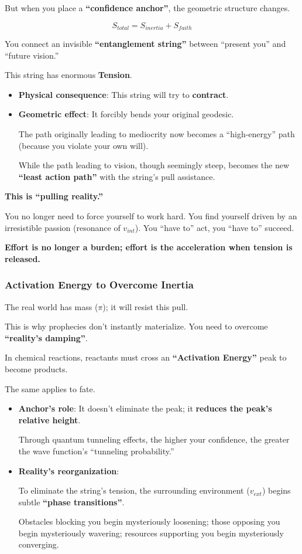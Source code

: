 But when you place a \textbf{``confidence anchor''}, the geometric structure changes.

\[S_{total} = S_{inertia} + S_{faith}\]

You connect an invisible \textbf{``entanglement string''} between ``present you'' and ``future vision.''

This string has enormous \textbf{Tension}.

\begin{itemize}
\item \textbf{Physical consequence}: This string will try to \textbf{contract}.

\item \textbf{Geometric effect}: It forcibly bends your original geodesic.

The path originally leading to mediocrity now becomes a ``high-energy'' path (because you violate your own will).

While the path leading to vision, though seemingly steep, becomes the new \textbf{``least action path''} with the string's pull assistance.
\end{itemize}

\textbf{This is ``pulling reality.''}

You no longer need to force yourself to work hard. You find yourself driven by an irresistible passion (resonance of $v_{int}$). You ``have to'' act, you ``have to'' succeed.

\textbf{Effort is no longer a burden; effort is the acceleration when tension is released.}

\subsubsection{Activation Energy to Overcome Inertia}

The real world has mass ($\pi$); it will resist this pull.

This is why prophecies don't instantly materialize. You need to overcome \textbf{``reality's damping''}.

In chemical reactions, reactants must cross an \textbf{``Activation Energy''} peak to become products.

The same applies to fate.

\begin{itemize}
\item \textbf{Anchor's role}: It doesn't eliminate the peak; it \textbf{reduces the peak's relative height}.

Through quantum tunneling effects, the higher your confidence, the greater the wave function's ``tunneling probability.''

\item \textbf{Reality's reorganization}:

To eliminate the string's tension, the surrounding environment ($v_{ext}$) begins subtle \textbf{``phase transitions''}.

Obstacles blocking you begin mysteriously loosening; those opposing you begin mysteriously wavering; resources supporting you begin mysteriously converging.
\end{itemize}

